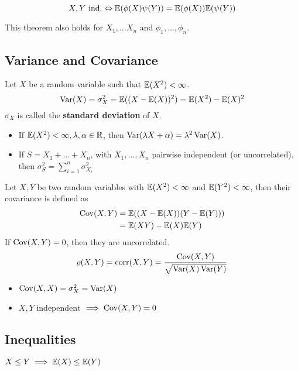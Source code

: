 \begin{theorem*} \vspace{-5pt}
  \[X, Y \ \text{ind.} \Leftrightarrow \mathbb{E}(\phi(X) \psi(Y)) = \mathbb{E}(\phi(X)) \mathbb{E}(\psi(Y))\]
\end{theorem*}
This theorem also holds for \(X_1, \ldots X_n\) and \(\phi_1, \ldots, \phi_n\).

\pagebreak
\subsection{Variance and Covariance}
\begin{definition*}[Variance]
  Let \(X\) be a random variable such that \(\mathbb{E}(X^2) < \infty\).
  \[\operatorname{Var}(X) = \sigma_X^2 = \mathbb{E}((X - \mathbb{E}(X))^2) = \mathbb{E}(X^2) - \mathbb{E}(X)^2\]
  \(\sigma_X\) is called the \textbf{standard deviation} of \(X\).
\end{definition*}

\begin{itemize}
  \item If \(\mathbb{E}(X^2) < \infty, \lambda, \alpha \in \mathbb{R}\), then \(\operatorname{Var}(\lambda X + \alpha) = \lambda^2 \operatorname{Var}(X)\).
  \item If \(S = X_1 + \ldots + X_n\), with \(X_1, \ldots, X_n\) pairwise independent (or uncorrelated), then \(\sigma_S^2 = \sum_{i = 1}^n \sigma_{X_i}^2\)
\end{itemize}

\begin{definition*}
  Let \(X, Y\) be two random variables with \(\mathbb{E}(X^2) < \infty\) and \(\mathbb{E}(Y^2) < \infty\), then their covariance is defined as
  \begin{align*}
    \operatorname{Cov}(X, Y) &= \mathbb{E}((X - \mathbb{E}(X))(Y - \mathbb{E}(Y))) \\
    &= \mathbb{E}(XY) - \mathbb{E}(X)\mathbb{E}(Y)
  \end{align*}
  If \(\operatorname{Cov}(X, Y) = 0\), then they are uncorrelated.
  \[\varrho(X, Y) = \text{corr}(X, Y) = \frac{\operatorname{Cov}(X, Y)}{\sqrt{\operatorname{Var}(X) \operatorname{Var}(Y)}}\]
\end{definition*}

\begin{itemize}
  \item \(\operatorname{Cov}(X, X) = \sigma_X^2 = \operatorname{Var}(X)\)
  \item \(X, Y\) independent \(\implies \operatorname{Cov}(X, Y) = 0\)
\end{itemize}

\subsection{Inequalities}
\begin{lemma}[Monotonicity]
  \(X \leq Y \implies \mathbb{E}(X) \leq \mathbb{E}(Y)\)
\end{lemma}

